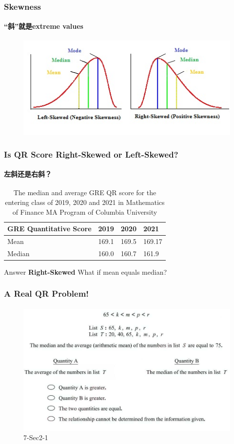 \documentclass[
	11pt, %
]{beamer}
\begin{document}

\begin{frame}
	\frametitle{Skewness}
	\framesubtitle{“斜”就是extreme values}
	\begin{figure}
		\includegraphics[width=0.8\linewidth]{Skewness.jpeg}
	\end{figure}
\end{frame}

\begin{frame}
	\frametitle{Is QR Score Right-Skewed or Left-Skewed?}
	\framesubtitle{左斜还是右斜？}

	\bigskip %
	\begin{table}
		\begin{tabular}{l l l l}
			\toprule
			\textbf{GRE Quantitative Score} & \textbf{2019} & \textbf{2020} & \textbf{2021}\\
			\midrule
			Mean & 169.1 & 169.5 & 169.17 \\
			Median & 160.0 & 160.7 & 161.9 \\
			\bottomrule
		\end{tabular}
		\caption{The median and average GRE QR score for the entering class of 2019, 2020 and 2021 in Mathematics of Finance MA Program of Columbia University}
	\end{table}

	\pause
	Answer \textbf{Right-Skewed} \alert{What if mean equals median?}
\end{frame}


\begin{frame}
	\frametitle{A Real QR Problem!}
	\framesubtitle{}
	\begin{figure}
		\includegraphics[width=\linewidth]{Median.png}
		\caption{7-Sec2-1}
	\end{figure}

\end{frame}
\end{document}
